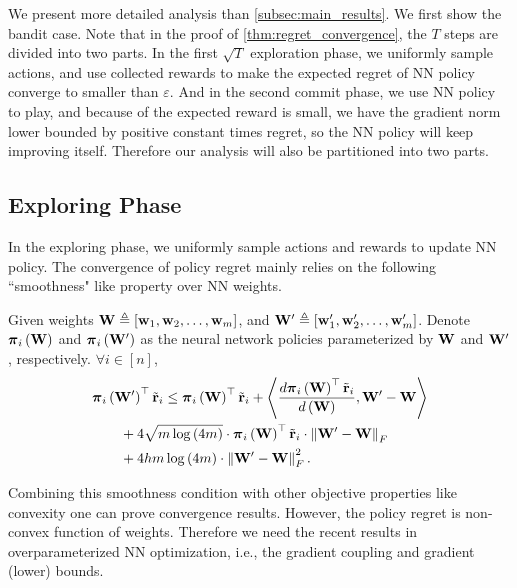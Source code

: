 We present more detailed analysis than \cref{subsec:main_results}. We first show the bandit case. Note that in the proof of \cref{thm:regret_convergence}, the $T$ steps are divided into two parts. In the first $\sqrt{T}$ exploration phase, we uniformly sample actions, and use collected rewards to make the expected regret of NN policy converge to smaller than $\varepsilon$. And in the second commit phase, we use NN policy to play, and because of the expected reward is small, we have the gradient norm lower bounded by positive constant times regret, so the NN policy will keep improving itself. Therefore our analysis will also be partitioned into two parts.

\subsection{Exploring Phase}
\label{subsec:exploring_phase}

In the exploring phase, we uniformly sample actions and rewards to update NN policy. The convergence of policy regret mainly relies on the following ``smoothness" like property over NN weights.

\begin{lem}
\label{lem:smoothness}
    Given weights ${\mathbf{W}} \triangleq \left[ {\mathbf{w}}_1, {\mathbf{w}}_2, \dots, {\mathbf{w}}_m \right]$, and ${\mathbf{W}}^\prime \triangleq \left[ {\mathbf{w}}_1^\prime, {\mathbf{w}}_2^\prime, \dots, {\mathbf{w}}_m^\prime \right]$. Denote ${\boldsymbol{\pi}}_i\left( {\mathbf{W}} \right)$ and ${\boldsymbol{\pi}}_i\left( {\mathbf{W}}^\prime \right)$ as the neural network policies parameterized by ${\mathbf{W}}$ and ${\mathbf{W}}^\prime$, respectively. $\forall i \in [n]$,
\begin{equation*}
\begin{split}
    &{\boldsymbol{\pi}}_i\left( {\mathbf{W}}^\prime \right)^\top {\tilde{\mathbf{r}}}_i \le {\boldsymbol{\pi}}_i\left( {\mathbf{W}} \right)^\top {\tilde{\mathbf{r}}}_i + \left\langle \frac{d {\boldsymbol{\pi}}_i\left( {\mathbf{W}} \right)^\top {\tilde{\mathbf{r}}}_i }{d\left( {\mathbf{W}} \right)}, {\mathbf{W}}^\prime - {\mathbf{W}} \right\rangle \\
    &\qquad + 4 \sqrt{m \log{\left(4m\right)}} \cdot {\boldsymbol{\pi}}_i\left( {\mathbf{W}} \right)^\top {\tilde{\mathbf{r}}}_i \cdot \left\| {\mathbf{W}}^\prime - {\mathbf{W}} \right\|_F \\
    &\qquad + 4 h m \log{\left(4m\right)} \cdot \left\| {\mathbf{W}}^\prime - {\mathbf{W}} \right\|_F^2.
\end{split}
\end{equation*}
\end{lem}

Combining this smoothness condition with other objective properties like convexity one can prove convergence results. However, the policy regret is non-convex function of weights. Therefore we need the recent results in overparameterized NN optimization, i.e., the gradient coupling and gradient (lower) bounds.

